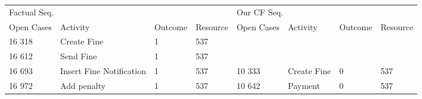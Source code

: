 \begin{tabular}{llllllll}
\toprule
\multicolumn{4}{l}{Factual Seq.} & \multicolumn{4}{l}{Our CF Seq.} \\
Open Cases & Activity & Outcome & Resource & Open Cases & Activity & Outcome & Resource \\
\midrule
16 318 & Create Fine & 1 & 537 &  &  &  &  \\
16 612 & Send Fine & 1 & 537 &  &  &  &  \\
16 693 & Insert Fine Notification & 1 & 537 & 10 333 & Create Fine & 0 & 537 \\
16 972 & Add penalty & 1 & 537 & 10 642 & Payment & 0 & 537 \\
\bottomrule
\end{tabular}
